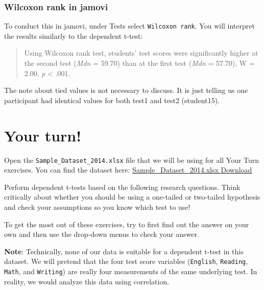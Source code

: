 \documentclass[
]{book}
\begin{document}
\hypertarget{wilcoxon-rank-in-jamovi}{%
\subsubsection{Wilcoxon rank in jamovi}\label{wilcoxon-rank-in-jamovi}}

To conduct this in jamovi, under Tests select \texttt{Wilcoxon\ rank}. You will interpret the results similarly to the dependent t-test:

\begin{quote}
Using Wilcoxon rank test, students' test scores were significantly higher at the second test (\emph{Mdn} = 59.70) than at the first test (\emph{Mdn} = 57.70), W = 2.00, \emph{p} \textless{} .001.
\end{quote}

The note about tied values is not necessary to discuss. It is just telling us one participant had identical values for both test1 and test2 (student15).

\hypertarget{your-turn-1}{%
\section{Your turn!}\label{your-turn-1}}

Open the \texttt{Sample\_Dataset\_2014.xlsx} file that we will be using for all Your Turn exercises. You can find the dataset here: \href{https://github.com/danawanzer/stats-with-jamovi/blob/master/data/Sample_Dataset_2014.xlsx}{Sample\_Dataset\_2014.xlsx Download}

Perform dependent t-tests based on the following research questions. Think critically about whether you should be using a one-tailed or two-tailed hypothesis and check your assumptions so you know which test to use!

To get the most out of these exercises, try to first find out the answer on your own and then use the drop-down menus to check your answer.

\textbf{Note}: Technically, none of our data is suitable for a dependent t-test in this dataset. We will pretend that the four test score variables (\texttt{English}, \texttt{Reading}, \texttt{Math}, and \texttt{Writing}) are really four measurements of the same underlying test. In reality, we would analyze this data using correlation.
\end{document}
